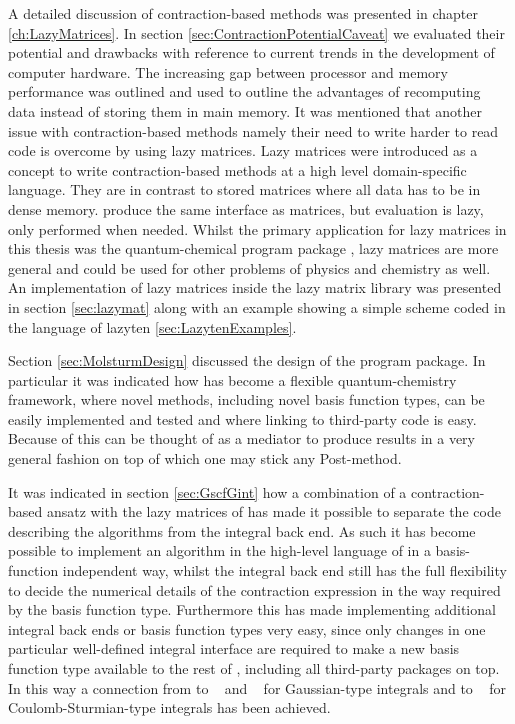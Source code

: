 
A detailed discussion of contraction-based methods was
presented in chapter \ref{ch:LazyMatrices}.
In section \ref{sec:ContractionPotentialCaveat}
we evaluated their potential and drawbacks
with reference to current trends in the development
of computer hardware.
The increasing gap between processor and memory performance
was outlined and used to outline the
advantages of recomputing data instead of storing them in main memory.
It was mentioned that another issue with contraction-based methods
namely their need to write harder to read code
is overcome by using lazy matrices.
Lazy matrices were introduced as a concept to write contraction-based
methods at a high level domain-specific language.
They are in contrast to stored matrices where all data has to be in dense memory.
produce the same interface as matrices,
but evaluation is lazy,
\ie only performed when needed.
Whilst the primary application for lazy matrices in this thesis was the quantum-chemical
program package \molsturm,
lazy matrices are more general and could be used for other problems
of physics and chemistry as well.
An implementation of lazy matrices inside the
lazy matrix library \lazyten was presented in section \ref{sec:lazymat}
along with an example showing a simple \SCF
scheme coded in the language of lazyten \ref{sec:LazytenExamples}.


Section \ref{sec:MolsturmDesign} discussed
the design of the \molsturm program package.
In particular it was indicated how
\molsturm has become a flexible quantum-chemistry framework,
where novel methods,
including novel basis function types,
can be easily implemented and tested
and where linking to third-party code is easy.
Because of this \molsturm can be thought of as a mediator
to produce \SCF results in a very general fashion
on top of which one may stick any Post-\HF method.

It was indicated in section \ref{sec:GscfGint}
how a combination of a contraction-based \SCF ansatz
with the lazy matrices of \lazyten
has made it possible to separate the code describing
the \SCF algorithms from the integral back end.
As such it has become possible to implement
an \SCF algorithm in the high-level language of \lazyten
in a basis-function independent way,
whilst the integral back end still has the full flexibility
to decide the numerical details
of the contraction expression in the way required by the basis function type.
Furthermore this has made implementing
additional integral back ends or basis function types very easy,
since only changes in one particular well-defined integral
interface are required to make
a new basis function type available to the rest of \molsturm,
including all third-party packages on top.
In this way a connection from \molsturm
to \libint~\cite{Libint2_231,Libint2} and \libcint~\cite{Sun2015}
for Gaussian-type integrals
and to \sturmint~\cite{sturmintWeb}
for Coulomb-Sturmian-type integrals has been achieved.

